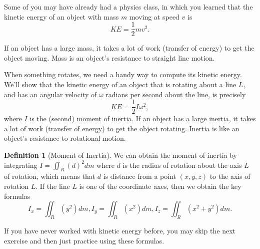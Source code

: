 \documentclass[10pt,]{book}
\theoremstyle{plain}
\theoremstyle{definition}
\newtheorem{definition}[theorem]{Definition}
\theoremstyle{definition}
\theoremstyle{definition}
\theoremstyle{definition}
\theoremstyle{definition}
\numberwithin{equation}{section}
\begin{document}
Some of you may have already had a physics class, in which you learned that the kinetic energy of an object with mass \(m\) moving at speed \(v\) is%
\begin{equation*}
KE = \frac{1}{2}mv^2.
\end{equation*}
%
\par
If an object has a large mass, it takes a lot of work (transfer of energy) to get the object moving. Mass is an object's resistance to straight line motion.%
\par
When something rotates, we need a handy way to compute its kinetic energy. We'll show that the kinetic energy of an object that is rotating about a line \(L\), and has an angular velocity of \(\omega\) radians per second about the line, is precisely %
\begin{equation*}
KE = \frac{1}{2}I \omega^2,
\end{equation*}
where \(I\) is the (second) moment of inertia. If an object has a large inertia, it takes a lot of work (transfer of energy) to get the object rotating. Inertia is like an object's resistance to rotational motion.%
\begin{definition}[{Moment of Inertia}]\label{definition-41}
We can obtain the moment of inertia by integrating \(I=\iint_R (d)^2 dm\) where \(d\) is the radius of rotation about the axis \(L\) of rotation, which means that \(d\) is distance from a point \((x,y,z)\) to the axis of rotation \(L\). If the line \(L\) is one of the coordinate axes, then we obtain the key formulas%
\begin{equation*}
I_x = \iint_R (y^2)dm,
I_y = \iint_R (x^2)dm,
I_z = \iint_R (x^2+y^2)dm
.
\end{equation*}
%
\end{definition}
If you have never worked with kinetic energy before, you may skip the next exercise and then just practice using these formulas.%
\end{document}
